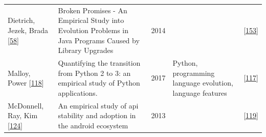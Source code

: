 \documentclass[]{book}
\begin{document}
\begin{longtable}[]{@{}lllll@{}}
\begin{minipage}[t]{0.12\columnwidth}\raggedright\strut
Dietrich, Jezek, Brada
{[}\protect\hyperlink{ref-Dietrich2014}{58}{]}\strut
\end{minipage} & \begin{minipage}[t]{0.31\columnwidth}\raggedright\strut
Broken Promises - An Empirical Study into Evolution Problems in Java
Programs Caused by Library Upgrades\strut
\end{minipage} & \begin{minipage}[t]{0.02\columnwidth}\raggedright\strut
2014\strut
\end{minipage} & \begin{minipage}[t]{0.24\columnwidth}\raggedright\strut
\strut
\end{minipage} & \begin{minipage}[t]{0.16\columnwidth}\raggedright\strut
{[}\protect\hyperlink{ref-Raemaekers2017}{153}{]}\strut
\end{minipage}\tabularnewline
\begin{minipage}[t]{0.12\columnwidth}\raggedright\strut
Malloy, Power {[}\protect\hyperlink{ref-Malloy2017}{118}{]}\strut
\end{minipage} & \begin{minipage}[t]{0.31\columnwidth}\raggedright\strut
Quantifying the transition from Python 2 to 3: an empirical study of
Python applications.\strut
\end{minipage} & \begin{minipage}[t]{0.02\columnwidth}\raggedright\strut
2017\strut
\end{minipage} & \begin{minipage}[t]{0.24\columnwidth}\raggedright\strut
Python, programming language evolution, language features\strut
\end{minipage} & \begin{minipage}[t]{0.16\columnwidth}\raggedright\strut
{[}\protect\hyperlink{ref-Malloy2018}{117}{]}\strut
\end{minipage}\tabularnewline
\begin{minipage}[t]{0.12\columnwidth}\raggedright\strut
McDonnell, Ray, Kim
{[}\protect\hyperlink{ref-McDonnell2013}{124}{]}\strut
\end{minipage} & \begin{minipage}[t]{0.31\columnwidth}\raggedright\strut
An empirical study of api stability and adoption in the android
ecosystem\strut
\end{minipage} & \begin{minipage}[t]{0.02\columnwidth}\raggedright\strut
2013\strut
\end{minipage} & \begin{minipage}[t]{0.24\columnwidth}\raggedright\strut
\strut
\end{minipage} & \begin{minipage}[t]{0.16\columnwidth}\raggedright\strut
{[}\protect\hyperlink{ref-Manikas2016}{119}{]}\strut
\end{minipage}\tabularnewline
\bottomrule
\end{longtable}
\end{document}
